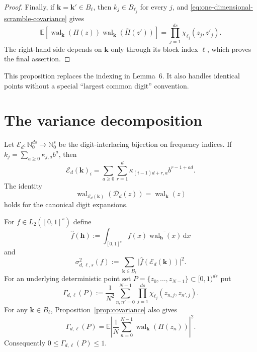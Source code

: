 \documentclass[11pt]{article}
\newcommand{\Nzero}{\mathbb N_0}
\newcommand{\D}{\mathcal D}
\newcommand{\E}{\mathcal E}
\newcommand{\wal}{\operatorname{wal}}
\newcommand{\abs}[1]{\lvert #1\rvert}
\newcommand{\set}[1]{\{#1\}}
\newcommand{\dd}{\,\mathrm d}
\begin{document}
\begin{proof}
Finally, if
\(\boldsymbol k=\boldsymbol k'\in B_{\boldsymbol\ell}\), then
\(k_j\in B_{\ell_j}\) for every \(j\), and
\eqref{eq:one-dimensional-scramble-covariance} gives
\[
 \mathbb E\!\left[
 \wal_{\boldsymbol k}(\Pi(z))
 \overline{\wal_{\boldsymbol k}(\Pi(z'))}
 \right]
 =
 \prod_{j=1}^{ds}
 \chi_{\ell_j}(z_j,z'_j).
\]
The right-hand side depends on \(\boldsymbol k\) only through its block
index \(\boldsymbol\ell\), which proves the final assertion.
\end{proof}




This proposition replaces the indexing in Lemma~6.  It also handles identical
points without a special ``largest common digit'' convention. 

\section{The variance decomposition}

Let $\E_d:\Nzero^{ds}\to\Nzero^s$ be the digit-interlacing bijection on
frequency indices.  If
$k_j=\sum_{a\ge0}\kappa_{j,a}b^a$, then
\[
 \E_d(\boldsymbol k)_i
 =\sum_{a\ge0}\sum_{r=1}^{d}
   \kappa_{(i-1)d+r,a}b^{r-1+ad}.
\]
The identity
\begin{equation}\label{eq:wal-interlace}
 \wal_{\E_d(\boldsymbol k)}(\D_d(z))=\wal_{\boldsymbol k}(z)
\end{equation}
holds for the canonical digit expansions.

For $f\in L_2([0,1]^s)$ define
\[
 \widehat f(\boldsymbol h)
 :=\int_{[0,1]^s}f(x)\overline{\wal_{\boldsymbol h}(x)}\dd x
\]
and
\begin{equation}\label{eq:sigma-def}
 \sigma_{d,\boldsymbol\ell,s}^2(f)
 :=\sum_{\boldsymbol k\in B_{\boldsymbol\ell}}
       \abs{\widehat f(\E_d(\boldsymbol k))}^2.
\end{equation}
For an underlying deterministic point set
$P=\set{z_0,\ldots,z_{N-1}}\subset[0,1)^{ds}$ put
\begin{equation}\label{eq:gain-def}
 \Gamma_{d,\boldsymbol\ell}(P)
 :=\frac1{N^2}\sum_{n,n'=0}^{N-1}
       \prod_{j=1}^{ds}\chi_{\ell_j}(z_{n,j},z_{n',j}).
\end{equation}
For any $\boldsymbol k\in B_{\boldsymbol\ell}$,
Proposition~\ref{prop:covariance} also gives
\begin{equation}\label{eq:gain-square}
 \Gamma_{d,\boldsymbol\ell}(P)
 =\mathbb E\left|\frac1N\sum_{n=0}^{N-1}
   \wal_{\boldsymbol k}(\Pi(z_n))\right|^2.
\end{equation}
Consequently $0\le\Gamma_{d,\boldsymbol\ell}(P)\le1$.
\end{document}
